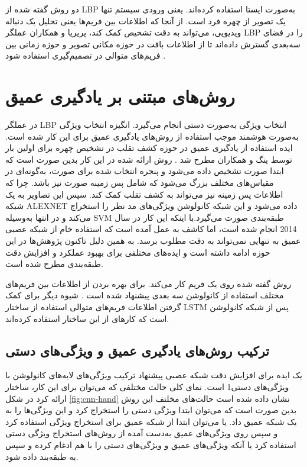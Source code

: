 دو روش گفته شده از LBP به‌صورت ایستا استفاده کرده‌اند. یعنی ورودی سیستم تنها یک تصویر از چهره فرد است. از آنجا که اطلاعات بین فریم‌ها یعنی تحلیل یک دنباله ویدیویی، می‌تواند به دقت تشخیص کمک کند، پریریا و همکاران عملگر LBP را در فضای سه‌بعدی گسترش داده‌اند تا از اطلاعات بافت در حوزه مکانی تصویر و حوزه زمانی بین فریم‌های متوالی در تصمیم‌گیری استفاده شود
\cite{freitas2012lbp}.
\section{روش‌های مبتنی بر یادگیری عمیق}
 در عملگر LBP انتخاب ویژگی به‌صورت دستی انجام می‌گیرد. انگیزه انتخاب ویژگی به‌صورت هوشمند موجب استفاده از روش‌های یادگیری عمیق برای این کار شده است. ایده استفاده از یادگیری عمیق در حوزه کشف تقلب در تشخیص چهره برای اولین بار توسط ینگ و همکاران مطرح شد 
\cite{yang2014learn}
.
 روش ارائه شده در این کار بدین صورت است که ابتدا صورت تشخیص داده می‌شود و پنجره انتخاب شده برای صورت، به‌گونه‌ای در مقیاس‌های مختلف بزرگ می‌شود که شامل پس زمینه صورت نیز باشد. چرا که اطلاعات پس زمینه نیز می‌تواند به کشف تقلب کمک کند. سپس این تصاویر به یک شبکه ALEXNET
\cite{krizhevsky2012imagenet}
  داده می‌شود و این شبکه کانولوشن ویژگی‌های مد نظر را استخراج می‌کند و در انتها به‌وسیله SVM طبقه‌بندی صورت می‌گیرد.با اینکه این کار در سال 2014 انجام شده است، اما کاشف به عمل آمده است که استفاده خام از شبکه عصبی عمیق به تنهایی نمی‌تواند به دقت مطلوب برسد. به همین دلیل تاکنون پژوهش‌ها در این حوزه ادامه داشته است و ایده‌های مختلفی برای بهبود عملکرد و افزایش دقت طبقه‌بندی مطرح شده است. 
 
 روش گفته شده روی یک فریم کار می‌کند. برای بهره بردن از اطلاعات بین فریم‌های مختلف استفاده از کانولوشن سه بعدی پیشنهاد شده است 
\cite{gan20173d,li2018learning}
 . شیوه دیگر برای کمک گرفتن اطلاعات فریم‌های متوالی استفاده از ساختار
LSTM \cite{hochreiter1997long}
  پس از شبکه کانولوشن است که کارهای
\cite{xu2015learning,yang2019face}
از این ساختار استفاده کرده‌اند.
 

\subsection{ترکیب روش‌های یادگیری عمیق و ویژگی‌های دستی}
یک ایده برای افزایش دقت شبکه عصبی پیشنهاد ترکیب ویژگی‌های لایه‌های کانولوشن با ویژگی‌های دستی1 است. نمای کلی حالت مختلفی که می‌توان برای این کار، ساختار ارائه کرد در شکل 
\ref{fig:cnn-hand}
نشان داده شده است 
\cite{yu2021deep}
 حالت‌های مخلتف این روش بدین صورت است که می‌توان ابتدا ویژگی دستی را استخراج کرد و این ویژگی‌ها را به یک شبکه عمیق داد. یا می‌توان ابتدا از شبکه عمیق برای استخراج ویژگی استفاده کرد و سپس روی ویژگی‌های عمیق به‌دست آمده از روش‌های استخراج ویژگی دستی استفاده کرد یا آنکه ویژگی‌های عمیق و ویژگی‌های دستی را با هم ادغام کرده و سپس به طبقه‌بند داده شود.


